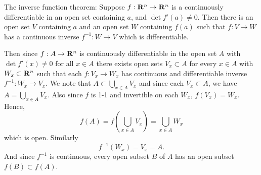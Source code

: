 
\begin{solution}
    The inverse function theorem:
    Suppose $f:\mathbf{R}^n\to\mathbf{R}^n$ is a continuously
    differentiable in an open set containing
    $a$, and $\det{f'(a)}\ne 0$. Then there
    is an open set $V$ containing $a$ and an
    open set $W$ containing $f(a)$ such that
    $f:V\to W$ has a continuous inverse $f^{-1}
    :W\to V$ which is differentiable.

    Then since $f:A\to\mathbf{R}^n$ is continuously
    differentiable in the open set $A$ with
    $\det{f'(x)}\ne 0$ for all $x\in A$ there
    exists open sets $V_x \subset A$ for
    every $x\in A$ with $W_x \subset \mathbf{R}^n$
    such that each $f:
    V_x\to W_x$ has continuous and differentiable
    inverse $f^{-1}:
    W_x\to V_x$. We note that $A\subset
    \bigcup_{x\in A}{V_x}$ and since each $V_x
    \subset A$, we have $A=\bigcup_{x\in A}{V_x}$.
    Also since $f$ is 1-1 and
    invertible on each $W_x$, $f(V_x)=W_x$.
    Hence,
    $$f(A)= f\left(\bigcup_{x\in A}
        {V_x}\right)=\bigcup_{x\in A}{W_x}$$
    which is open. Similarly
    $$f^{-1}(W_x)=V_x=A.$$
    And since $f^{-1}$ is continuous,
    every open subset $B$ of $A$ has an open
    subset $f(B)\subset f(A)$.
\end{solution}
